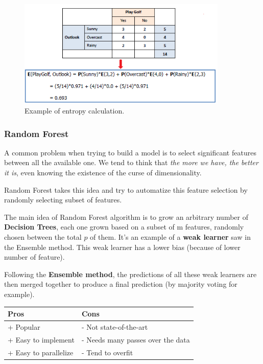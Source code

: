 \begin{figure}[H]%
 \centering
 \includegraphics[width=10cm]{./img/07/entropy.png}
 \caption{\label{pic:entropy} Example of entropy calculation.}
\end{figure}






\subsubsection{Random Forest}

A common problem when trying to build a model is to select significant features between all the available one. We tend to think that \textit{the more we have, the better it is}, even knowing the existence of the curse of dimensionality. 

Random Forest takes this idea and try to automatize this feature selection by randomly selecting subset of features.

The main idea of Random Forest algorithm is to grow an arbitrary number of \textbf{Decision Trees}, each one grown based on a subset of m features, randomly chosen between the total $p$ of them. It's an example of a \textbf{weak learner} saw in the Ensemble method. This weak learner has a lower bias (because of lower number of feature).

Following the \textbf{Ensemble method}, the predictions of all these weak learners are then merged together to produce a final prediction (by majority voting for example).



\begin{center} %
\begin{tabular} {| l | l |}
\hline
\bf Pros & \bf Cons \\ \hline
+ Popular & - Not state-of-the-art  \\
+ Easy to implement & - Needs many passes over the data \\
+ Easy to parallelize & - Tend to overfit \\ 
\hline
\end{tabular}
\end{center}

